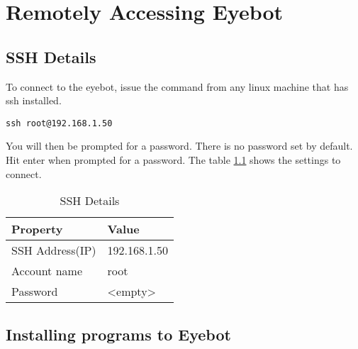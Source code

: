 
\appendix




\ifpdf
    \graphicspath{{9_backmatter/figures/PNG/}{9_backmatter/figures/PDF/}{9_backmatter/figures/}}
\else
    \graphicspath{{9_backmatter/figures/EPS/}{9_backmatter/figures/}}
\fi


\chapter{Remotely Accessing Eyebot}

\section{SSH Details}

To connect to the eyebot, issue the command from any linux machine that has ssh installed.

\begin{verbatim}
ssh root@192.168.1.50
\end{verbatim}

You will then be prompted for a password. There is no password set by default. Hit enter when prompted for a password. The table \ref{app:tab:sshdetails} shows the settings to connect.

\begin{table}
    \begin{tabular}{|l|l|}
        \hline
        Property        & Value        \\ \hline
        SSH Address(IP) & 192.168.1.50 \\ 
        Account name    & root         \\ 
        Password        & <empty>      \\
        \hline
    \end{tabular}
	\caption{SSH Details}
	\label{app:tab:sshdetails}
\end{table}

\section{Installing programs to Eyebot}

